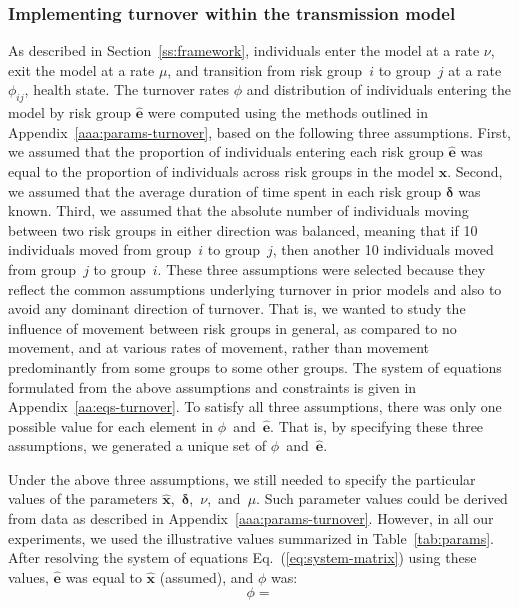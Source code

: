 \subsubsection{Implementing turnover within the transmission model}
\label{sss:turnover-implemented}
As described in Section~\ref{ss:framework}, individuals
enter the model at a rate $\nu$,
exit the model at a rate $\mu$,
and transition from risk group~$i$ to group~$j$ at a rate $\phi_{ij}$,
 health state.
The turnover rates $\phi$ and
distribution of individuals entering the model by risk group $\bm{\hat{e}}$
were computed using the methods outlined in
Appendix~\ref{aaa:params-turnover}, based on the following three assumptions.
First, we assumed that
the proportion of individuals entering each risk group $\bm{\hat{e}}$
was equal to the proportion of individuals across risk groups in the model $\bm{\hat{x}}$.
Second, we assumed that
the average duration of time spent in each risk group $\bm{\delta}$ was known.
Third, we assumed that the absolute number of individuals
moving between two risk groups in either direction was balanced,
meaning that if 10 individuals moved from group~$i$ to group~$j$,
then another 10 individuals moved from group~$j$ to group~$i$.
These three assumptions were selected
because they reflect the common assumptions underlying turnover in prior models
\citep{Zhang2012,Henry2015}
and also to avoid any dominant direction of turnover.
That is, we wanted to study
the influence of movement between risk groups in general,
as compared to no movement, and at various rates of movement,
rather than movement predominantly from some groups to some other groups.
The system of equations formulated from the above assumptions and constraints
is given in Appendix~\ref{aa:eqs-turnover}.
To satisfy all three assumptions, there was only one possible value
for each element in $\phi$~and~$\bm{\hat{e}}$.
That is, by specifying these three assumptions,
we generated a unique set of $\phi$~and~$\bm{\hat{e}}$.
\par
Under the above three assumptions,
we still needed to specify the particular values of the parameters
$\bm{\hat{x}}$,~$\bm{\delta}$,~$\nu$,~and~$\mu$.
Such parameter values could be derived from data as described in Appendix~\ref{aaa:params-turnover}.
However, in all our experiments, we used the illustrative values summarized in
Table~\ref{tab:params}.
After resolving the system of equations Eq.~(\ref{eq:system-matrix}) using these values,
$\bm{\hat{e}}$ was equal to $\bm{\hat{x}}$ (assumed), and $\phi$ was:
\begin{equation}
\label{eq:phi-values}
\phi = 
\end{equation}
